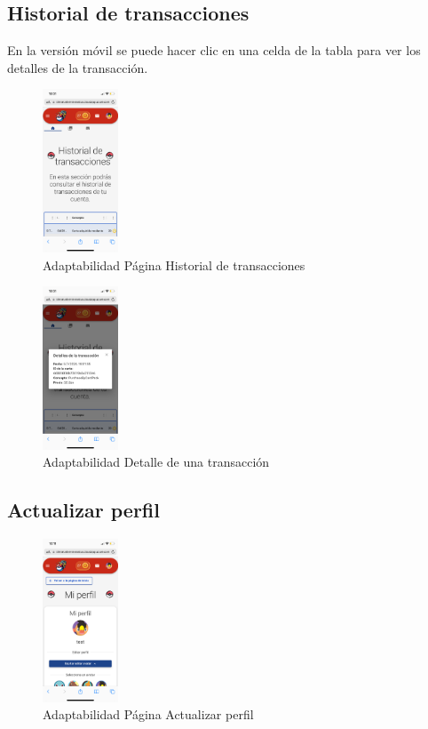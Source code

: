 \subsection*{Historial de transacciones}
En la versión móvil se puede hacer clic en una celda de la tabla para ver los detalles de la transacción.
\begin{figure}[H]
    \centering
    \includegraphics[width=0.2\textwidth]{figures/adaptabilidad/transacciones_1.png}
    \caption{Adaptabilidad Página Historial de transacciones}
    \label{fig:Adap-Historial}
\end{figure}

\begin{figure}[H]
    \centering
    \includegraphics[width=0.2\textwidth]{figures/adaptabilidad/transacciones_2.png}
    \caption{Adaptabilidad Detalle de una transacción}
    \label{fig:Adap-Detalle-Transaccion}
\end{figure}


\subsection*{Actualizar perfil}
\begin{figure}[H]
    \centering
    \includegraphics[width=0.2\textwidth]{figures/adaptabilidad/perfil.png}
    \caption{Adaptabilidad Página Actualizar perfil}
    \label{fig:Adap-Actualizar-Perfil}
\end{figure}


